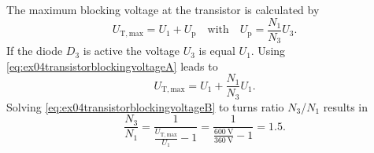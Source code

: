
\vspace{-0.5cm}
\begin{solutionblock}
    The maximum blocking voltage at the transistor is calculated by
    \begin{equation}
        U_\mathrm{T,max}=U_\mathrm{1}+U_\mathrm{p} \quad \text{with} \quad U_\mathrm{p}=\frac{N_\mathrm{1}}{N_\mathrm{3}} U_\mathrm{3}.
        \label{eq:ex04transistorblockingvoltageA}
    \end{equation} 
    If the diode $D_\mathrm{3}$ is active the voltage $U_\mathrm{3}$ is equal $U_\mathrm{1}$.
    Using \eqref{eq:ex04transistorblockingvoltageA} leads to
    \begin{equation}
        U_\mathrm{T,max}=U_\mathrm{1}+\frac{N_\mathrm{1}}{N_\mathrm{3}} U_\mathrm{1}.
        \label{eq:ex04transistorblockingvoltageB}
    \end{equation}
    Solving \eqref{eq:ex04transistorblockingvoltageB} to turns ratio $N_\mathrm{3}$/$N_\mathrm{1}$ results in
    \begin{equation}
        \frac{N_\mathrm{3}}{N_\mathrm{1}}=\frac{1}{\frac{U_\mathrm{T,max}}{U_\mathrm{1}}-1}
        =\frac{1}{\frac{\SI{600}{\volt}}{\SI{360}{\volt}}-1}=1.5.
    \end{equation}
\end{solutionblock}
          
